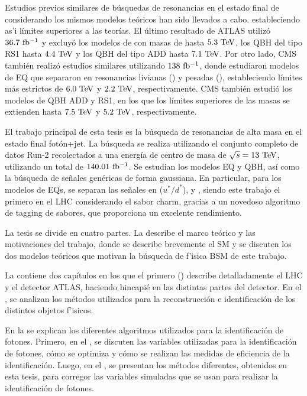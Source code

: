 Estudios previos similares de b\'usquedas de resonancias en el estado final de \gammajet considerando los mismos modelos teóricos han sido llevados a cabo. estableciendo as'i límites superiores a las teorías. El último resultado de \ac{ATLAS} utilizó \(36.7~\ifb\) y excluyó los modelos de \qstar con masas de hasta \(5.3~\tev\), los \ac{QBH} del tipo RS1 hasta \(4.4~\tev\) y los \ac{QBH} del tipo ADD hasta \(7.1~\tev\). Por otro lado, \ac{CMS} también realizó estudios similares utilizando \(138~\ifb\), donde estudiaron modelos de \ac{EQ} que separaron en resonancias livianas (\qstar) y pesadas (\bstar), estableciendo límites m\'as estrictos de \(6.0~\tev\) y \(2.2~\tev\), respectivamente. \ac{CMS} también estudió los modelos de \ac{QBH} ADD y RS1, en los que los límites superiores de las masas se extienden hasta \(7.5~\tev\) y \(5.2~\tev\), respectivamente.

El trabajo principal de esta tesis es la búsqueda de resonancias de alta masa en el estado final fotón+jet. La búsqueda se realiza utilizando el conjunto completo de datos Run-2 recolectados a una energía de centro de masa de \(\sqs=13~\tev\), utilizando un total de \(140.01~\ifb\). Se estudian los modelos \ac{EQ} y \ac{QBH}, así como la búsqueda de señales genéricas de forma gaussiana.
En particular, para los modelos de \acp{EQ}, se separan las señales en \qstar (\(u^*/d^*\)), \cstar y \bstar, siendo este trabajo el primero en el \ac{LHC} considerando el sabor charm, gracias a un novedoso algoritmo de tagging de sabores, que proporciona un excelente rendimiento.




La tesis se divide en cuatro partes.
La \Part{\ref{part:theory}} describe el marco teórico y las motivaciones del trabajo, donde se describe brevemente el \ac{SM} y se discuten los dos modelos teóricos que motivan la b\'usqueda de f'isica \ac{BSM} de este trabajo.

La \Part{\ref{part:exp_setup}} contiene dos capítulos en los que el primero (\Ch{\ref{ch:atlas}}) describe detalladamente el \ac{LHC} y el detector \ac{ATLAS}, haciendo hincapié en las distintas partes del detector. En el \Ch{\ref{ch:objects}}, se analizan los métodos utilizados para la reconstrucción e identificación de los distintos objetos f'isicos.

En la \Part{\ref{part:pid}} se explican los diferentes algoritmos utilizados para la identificación de fotones. Primero, en el \Ch{\ref{ch:pid_ss}}, se discuten las variables utilizadas para la identificación de fotones, cómo se optimiza y cómo se realizan las medidas de eficiencia de la identificación. Luego, en el \Ch{\ref{ch:ss_corrections}}, se presentan los métodos diferentes, obtenidos en esta tesis, para corregor las variables simuladas que se usan para realizar la identificación de fotones.

